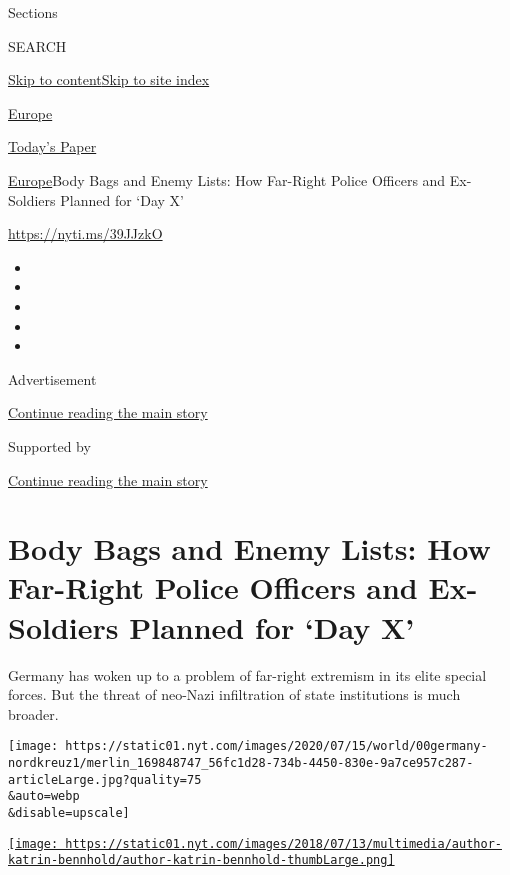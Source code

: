 Sections

SEARCH

\protect\hyperlink{site-content}{Skip to
content}\protect\hyperlink{site-index}{Skip to site index}

\href{https://www.nytimes.com/section/world/europe}{Europe}

\href{https://myaccount.nytimes.com/auth/login?response_type=cookie\&client_id=vi}{}

\href{https://www.nytimes.com/section/todayspaper}{Today's Paper}

\href{/section/world/europe}{Europe}\textbar{}Body Bags and Enemy Lists:
How Far-Right Police Officers and Ex-Soldiers Planned for `Day X'

\url{https://nyti.ms/39JJzkO}

\begin{itemize}
\item
\item
\item
\item
\item
\end{itemize}

Advertisement

\protect\hyperlink{after-top}{Continue reading the main story}

Supported by

\protect\hyperlink{after-sponsor}{Continue reading the main story}

\hypertarget{body-bags-and-enemy-lists-how-far-right-police-officers-and-ex-soldiers-planned-for-day-x}{%
\section{Body Bags and Enemy Lists: How Far-Right Police Officers and
Ex-Soldiers Planned for `Day
X'}\label{body-bags-and-enemy-lists-how-far-right-police-officers-and-ex-soldiers-planned-for-day-x}}

Germany has woken up to a problem of far-right extremism in its elite
special forces. But the threat of neo-Nazi infiltration of state
institutions is much broader.

\texttt{[image: https://static01.nyt.com/images/2020/07/15/world/00germany-nordkreuz1/merlin\_169848747\_56fc1d28-734b-4450-830e-9a7ce957c287-articleLarge.jpg?quality=75\\\&auto=webp\\\&disable=upscale]}

\href{https://www.nytimes.com/by/katrin-bennhold}{\texttt{[image: https://static01.nyt.com/images/2018/07/13/multimedia/author-katrin-bennhold/author-katrin-bennhold-thumbLarge.png]}}

